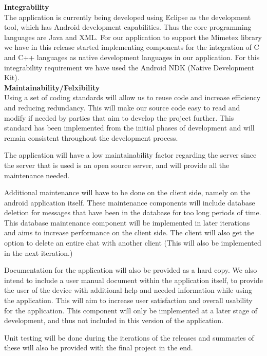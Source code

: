 \documentclass[29pt,a4paper]{moderncv}
\begin{document}
			\noindent\textbf{Integrability}\\
				The application is currently being developed using Eclipse as the development tool, which has Android development capabilities.  Thus the core programming languages are Java and XML.  For our application to support the Mimetex library we have in this release started implementing components for the integration of C and C++ languages as native development languages in our application.  For this integrability requirement we have used the Android NDK (Native Development Kit).
				\\
							
			\noindent\textbf{Maintainability/Felxibility}
				\\Using a set of coding standards will allow us to reuse code and increase efficiency and reducing redundancy. This will make our source code easy to read and modify if needed by parties that aim to develop the project further.  This standard has been implemented from the initial phases of development and will remain consistent throughout the development process.
				
				The application will have a low maintainability factor regarding the server since the server that is used is an open source server, and will provide all the maintenance needed.
				
				Additional maintenance will have to be done on the client side, namely on the android application itself.  These maintenance components will include database deletion for messages that have been in the database for too long periods of time.  This database maintenance component will be implemented in later iterations and aims to increase performance on the client side. 
				The client will also get the option to delete an entire chat with another client (This will also be implemented in the next iteration.)
				
				Documentation for the application will also be provided as a hard copy.  We also intend to include a user manual document within the application itself, to provide the user of the device with additional help and needed information while using the application. This will aim to increase user satisfaction and overall usability for the application.  This component will only be implemented at a later stage of development, and thus not included in this version of the application.
				
				Unit testing will be done during the iterations of the releases and summaries of these will also be provided with the final project in the end.\\
				
\end{document}
